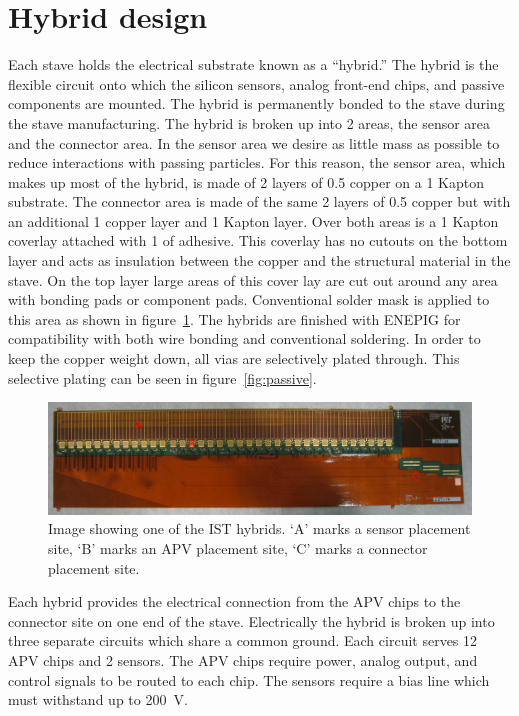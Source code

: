 \documentclass[1p,12pt]{elsarticle}
\begin{document}
\section{Hybrid design}
Each stave holds the electrical substrate known as a ``hybrid.''  The hybrid is
the flexible circuit onto which the silicon sensors, analog front-end chips, and passive
components are mounted. The hybrid is permanently bonded to the stave during
the stave manufacturing. The hybrid is broken up into 2 areas, the sensor area
and the connector area. In the sensor
area we desire as little mass as possible to reduce interactions with passing
particles. For this reason, the sensor area, which makes up most of the hybrid,
is made of 2 layers of \SI{0.5}{\ounce} copper on a \SI{1}{\mil} Kapton substrate. The connector
area is made of the same 2 layers of \SI{0.5}{\ounce} copper but with an additional
\SI{1}{\ounce} copper layer and \SI{1}{\mil} Kapton layer. Over both areas is a \SI{1}{\mil} Kapton
coverlay attached with \SI{1}{\mil} of adhesive. This coverlay has no cutouts on the
bottom layer and acts as insulation between the copper and the structural
material in the stave. On the top layer large areas of this cover lay are cut out around
any area with bonding pads or component pads. Conventional solder mask is
applied to this area as shown in figure~\ref{fig:hybrid}. The hybrids are finished with ENEPIG for compatibility
with both wire bonding and conventional soldering. In order to keep the copper
weight down, all vias are selectively plated through.  This selective plating
can be seen in figure~\ref{fig:passive}.

\begin{figure}[h]
\begin{center}
\includegraphics[width=5in, keepaspectratio=true, angle=0]{graphics/hybrid.jpg}
\caption{Image showing one of the IST hybrids. `A' marks a sensor placement site,
`B' marks an APV placement site, `C' marks a connector placement site.
\label{fig:hybrid}}
\end{center}
\end{figure}
%
Each hybrid provides the electrical connection from the APV chips to the
connector site on one end of the stave. Electrically the hybrid is broken up
into three separate circuits which share a common ground. Each circuit
serves 12 APV chips and 2 sensors. The APV chips require power, analog output,
and control signals to be routed to each chip. The sensors require a bias line
which must withstand up to \SI{200}{\volt}.
\end{document}
